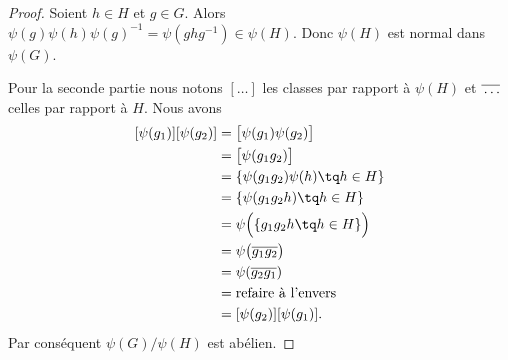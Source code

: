 \begin{proof}
	Soient \( h\in H\) et \( g\in G\). Alors \( \psi(g)\psi(h)\psi(g)^{-1}=\psi(ghg^{-1})\in\psi(H)\). Donc \( \psi(H)\) est normal dans \( \psi(G)\).

	Pour la seconde partie nous notons \( [\ldots]\) les classes par rapport à \( \psi(H)\) et \( \overline{ \vphantom{g}\ldots }\) celles par rapport à \( H\). Nous avons
	\begin{subequations}
		\begin{align}
			[\psi(g_1)][\psi(g_2)] & =\big[ \psi(g_1)\psi(g_2) \big]            \\
			                       & =\big[ \psi(g_1g_2) \big]                  \\
			                       & =\{ \psi(g_1g_2)\psi(h)\tq h\in H \}       \\
			                       & =\{ \psi(g_1g_2h)\tq h\in H \}             \\
			                       & =\psi\Big(  \{ g_1g_2h\tq h\in H \}  \Big) \\
			                       & =\psi\big( \overline{ g_1g_2 } \big)       \\
			                       & =\psi(\overline{ g_2g_1 })                 \\
			                       & =\text{refaire à l'envers}                 \\
			                       & =[\psi(g_2)][\psi(g_1)].
		\end{align}
	\end{subequations}
	Par conséquent \( \psi(G)/\psi(H)\) est abélien.
\end{proof}
